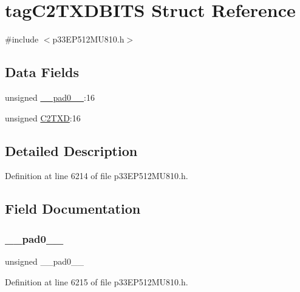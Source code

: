 \hypertarget{structtag_c2_t_x_d_b_i_t_s}{}\section{tag\+C2\+T\+X\+D\+B\+I\+TS Struct Reference}
\label{structtag_c2_t_x_d_b_i_t_s}


{\ttfamily \#include $<$p33\+E\+P512\+M\+U810.\+h$>$}

\subsection*{Data Fields}
\begin{DoxyCompactItemize}
\item 
unsigned \hyperlink{structtag_c2_t_x_d_b_i_t_s_adf71f3d8410c1f1dbbc96680a92c49af}{\+\_\+\+\_\+pad0\+\_\+\+\_\+}\+:16
\item 
unsigned \hyperlink{structtag_c2_t_x_d_b_i_t_s_ab7f1c507107af2857b2746b23d90eb42}{C2\+T\+XD}\+:16
\end{DoxyCompactItemize}


\subsection{Detailed Description}


Definition at line 6214 of file p33\+E\+P512\+M\+U810.\+h.



\subsection{Field Documentation}
\mbox{\label{structtag_c2_t_x_d_b_i_t_s_adf71f3d8410c1f1dbbc96680a92c49af}} 
\subsubsection{\texorpdfstring{\+\_\+\+\_\+pad0\+\_\+\+\_\+}{\_\_pad0\_\_}}
{\footnotesize\ttfamily unsigned \+\_\+\+\_\+pad0\+\_\+\+\_\+}



Definition at line 6215 of file p33\+E\+P512\+M\+U810.\+h.

